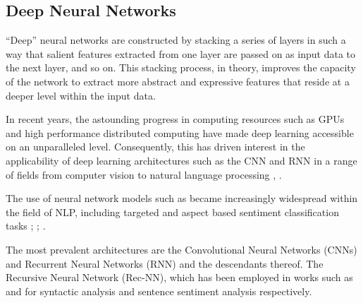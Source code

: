 \documentclass[../../fyp.tex]{subfiles}
\begin{document}
\subsection{Deep Neural Networks}
\enquote{Deep} neural networks are constructed by stacking a series of layers in such a way that salient features extracted from one layer are passed on as input data to the next layer, and so on. This stacking process, in theory, improves the capacity of the network to extract more abstract and expressive features that reside at a deeper level within the input data. \cite{zhang2018}

In recent years, the astounding progress in computing resources such as GPUs and high performance distributed computing have made deep learning accessible on an unparalleled level. Consequently, this has driven interest in the applicability of deep learning architectures such as the CNN and RNN in a range of fields from computer vision to natural language processing \cite{goldberg2015}, \cite{collobert2011}.

The use of neural network models such as \cite{lakkaraju2014} \cite{vo2015} \cite{nguyen2015}  became increasingly widespread within the field of NLP, including targeted and aspect based sentiment classification tasks \cite{dong}; \cite{wang}; \cite{tang2016} \cite{tang2016b}.

The most prevalent architectures are the Convolutional Neural Networks (CNNs) and Recurrent Neural Networks (RNN) and the descendants thereof. The Recursive Neural Network (Rec-NN), which has been employed in works such as \cite{socher2011} and \cite{socher2013} for syntactic analysis and sentence sentiment analysis respectively. \cite{zhang2018}


\end{document}
